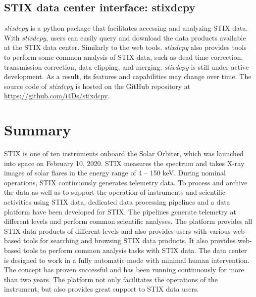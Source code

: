 \documentclass[referee]{aa} %
\begin{document}
\subsection{STIX data center interface:  stixdcpy}
{\it stixdcpy} is a python package that facilitates accessing and analyzing STIX data. 
With {\it stixdcpy}, users can easily query and download the data products available at the STIX data center.
Similarly to the web tools, {\it stixdcpy} also provides tools to perform some common analysis of STIX data, such as dead time correction, transmission correction, data clipping, and merging. 
{\it stixdcpy} is still under active development. 
As a result, its features and 
capabilities may change over time.  The source code of {\it stixdcpy} is hosted on the GitHub repository at \url{https://github.com/i4Ds/stixdcpy}.
\section{Summary}
\label{sec:summary}
STIX is one of ten instruments onboard the Solar Orbiter, 
which was launched into space on February 10, 2020.
 STIX measures the spectrum and takes X-ray images of solar 
 flares in the energy range of 4 -- 150 keV.  
 During nominal operations, STIX continuously generates telemetry data. 
 To process and archive the data as well as to support the operation of 
 instruments and scientific activities using STIX data, 
 dedicated data processing pipelines and a data platform have been 
 developed for STIX.
 The pipelines generate telemetry at different levels and perform common scientific analyses. 
 The platform provides 
 all STIX data products of different levels and also provides users 
 with various web-based tools for searching and browsing STIX data products. 
 It also provides web-based tools to perform common analysis tasks with STIX data. 
  The data center is designed to work in a 
 fully automatic mode with minimal human intervention. The concept has proven successful 
 and has been running continuously for more than two years.
The platform not only facilitates the operations of the instrument, but also provides great support to STIX data users.





\end{document}
